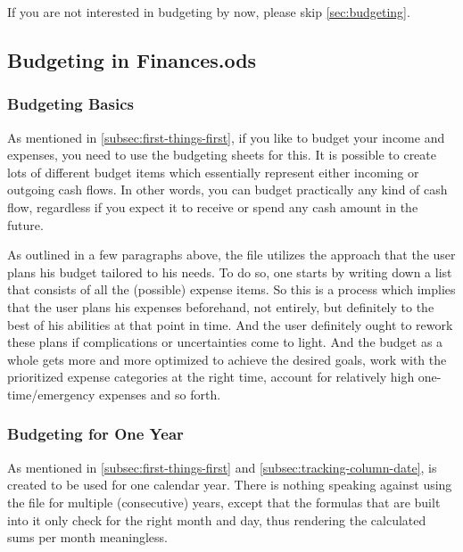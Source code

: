 \begin{specialnote}
	If you are not interested in budgeting by now, please skip  \autoref{sec:budgeting}.
\end{specialnote}

\subsection{Budgeting in Finances.ods}
\label{subsec:budgeting-in-finances.ods}

\subsubsection{Budgeting Basics}
\label{subsubsec:budgeting-basics}

As mentioned in \autoref{subsec:first-things-first}, if you like to budget your income and expenses, you need to use the budgeting sheets for this.
It is possible to create lots of different budget items which essentially represent either incoming or outgoing cash flows.
In other words, you can budget practically any kind of cash flow, regardless if you expect it to receive or spend any cash amount in the future.

As outlined in a few paragraphs above, the file utilizes the approach that the user plans his budget tailored to his needs.
To do so, one starts by writing down a list that consists of all the (possible) expense items.
So this is a process which implies that the user plans his expenses beforehand, not entirely, but definitely to the best of his abilities at that point in time.
And the user definitely ought to rework these plans if complications or uncertainties come to light.
And the budget as a whole gets more and more optimized to achieve the desired goals, work with the prioritized expense categories at the right time, account for relatively high one-time/emergency expenses and so forth.

\subsubsection{Budgeting for One Year}
\label{subsubsec:budgeting-for-one-year}

As mentioned in \autoref{subsec:first-things-first} and \autoref{subsec:tracking-column-date}, \tfn is created to be used for one calendar year.
There is nothing speaking against using the file for multiple (consecutive) years, except that the formulas that are built into it only check for the right month and day, thus rendering the calculated sums per month meaningless.

